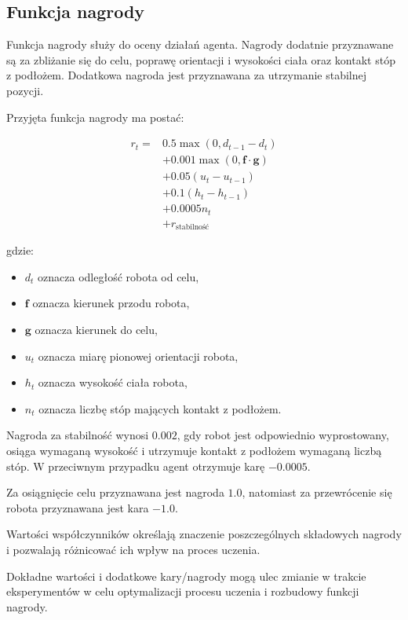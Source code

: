 \documentclass[12pt]{article}
\begin{document}
\subsection{Funkcja nagrody}

Funkcja nagrody służy do oceny działań agenta. Nagrody dodatnie
przyznawane są za zbliżanie się do celu, poprawę orientacji
i wysokości ciała oraz kontakt stóp z podłożem. Dodatkowa
nagroda jest przyznawana za utrzymanie stabilnej pozycji.

Przyjęta funkcja nagrody ma postać:

\begin{equation}
\begin{aligned}
r_t ={}&
0.5 \max(0, d_{t-1}-d_t) \\
&+ 0.001 \max(0, \mathbf{f}\cdot\mathbf{g}) \\
&+ 0.05(u_t-u_{t-1}) \\
&+ 0.1(h_t-h_{t-1}) \\
&+ 0.0005 n_t \\
&+ r_{\mathrm{stabilność}}
\end{aligned}
\end{equation}

gdzie:
\begin{itemize}
    \item $d_t$ oznacza odległość robota od celu,
    \item $\mathbf{f}$ oznacza kierunek przodu robota,
    \item $\mathbf{g}$ oznacza kierunek do celu,
    \item $u_t$ oznacza miarę pionowej orientacji robota,
    \item $h_t$ oznacza wysokość ciała robota,
    \item $n_t$ oznacza liczbę stóp mających kontakt z podłożem.
\end{itemize}

Nagroda za stabilność wynosi $0.002$, gdy robot jest odpowiednio
wyprostowany, osiąga wymaganą wysokość i utrzymuje kontakt
z podłożem wymaganą liczbą stóp. W przeciwnym przypadku
agent otrzymuje karę $-0.0005$.

Za osiągnięcie celu przyznawana jest nagroda $1.0$, natomiast
za przewrócenie się robota przyznawana jest kara $-1.0$.

Wartości współczynników określają znaczenie poszczególnych
składowych nagrody i pozwalają różnicować ich wpływ na proces
uczenia.

Dokładne wartości i dodatkowe kary/nagrody mogą ulec zmianie w trakcie 
eksperymentów w celu optymalizacji procesu uczenia i rozbudowy funkcji nagrody.
\end{document}
